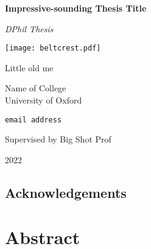 \documentclass[11pt, a4paper, twoside, openright]{memoir}
\begin{document}
\pagestyle{plain}
\thispagestyle{empty}
    \begin{center}
        \vspace{0.2cm}
        {\huge {\bfseries {Impressive-sounding Thesis Title}} \par}
        \vspace*{1ex}
        {\large \emph{DPhil Thesis} \par}
        {\large \vspace*{20mm} {{\texttt{[image: beltcrest.pdf]}} \par} \vspace*{25mm}}
        {\large \vspace*{1ex}
            {{\Large Little old me} \par}
            {{Name of College} \\ University of Oxford \par}
            \vspace*{1ex}
            {\texttt{email address} \par}
            \vspace{1.5cm}
            {Supervised by Big Shot Prof\par}
            \vspace*{1cm}
            {2022}
        }
    \end{center}
\newpage
\thispagestyle{empty}
\hfill
\clearpage

\section*{Acknowledgements}
\Blindtext

\chapter*{Abstract}
\blindtext
\clearpage

\setcounter{tocdepth}{2
}
\tableofcontents*
\clearpage
\listoffigures*
\clearpage
\listoftables*
\clearpage


\clearpage









\appendix

\end{document}
